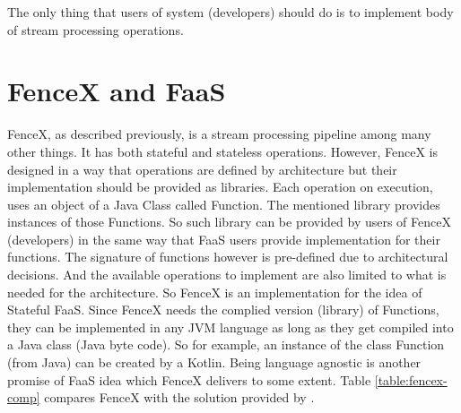 \documentclass[a4]{report}
\begin{document}
    The only thing that users of system (developers) should do is to implement body of stream processing operations.


    \section{FenceX and FaaS}
    FenceX, as described previously, is a stream processing pipeline among many other things.
    It has both stateful and stateless operations.
    However, FenceX is designed in a way that operations are defined by architecture but their implementation should
    be provided as libraries.
    Each operation on execution, uses an object of a Java Class called Function.
    The mentioned library provides instances of those Functions.
    So such library can be provided by users of FenceX (developers) in the same way that FaaS users provide
    implementation for their functions.
    The signature of functions however is pre-defined due to architectural decisions.
    And the available operations to implement are also limited to what is needed for the architecture.
    So FenceX is an implementation for the idea of Stateful FaaS.
    Since FenceX needs the complied version (library) of Functions, they can be implemented in any JVM language as long
    as they get compiled into a Java class (Java byte code).
    So for example, an instance of the class Function (from Java) can be created by a Kotlin\cite{kotlin}.
    Being language agnostic is another promise of FaaS idea which FenceX delivers to some extent.
    Table \ref{table:fencex-comp} compares FenceX with the solution provided by \cite{Functions-as-a-Service-2020}.
\end{document}
